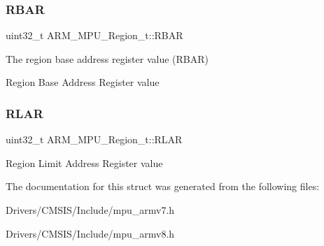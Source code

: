 \subsubsection{\texorpdfstring{RBAR}{RBAR}}
{\footnotesize\ttfamily uint32\+\_\+t A\+R\+M\+\_\+\+M\+P\+U\+\_\+\+Region\+\_\+t\+::\+R\+B\+AR}



The region base address register value (R\+B\+AR) 

Region Base Address Register value \mbox{\label{struct_a_r_m___m_p_u___region__t_ab5d3a650dbffd0b272bf7df5b140e8a8}} 
\subsubsection{\texorpdfstring{RLAR}{RLAR}}
{\footnotesize\ttfamily uint32\+\_\+t A\+R\+M\+\_\+\+M\+P\+U\+\_\+\+Region\+\_\+t\+::\+R\+L\+AR}

Region Limit Address Register value 

The documentation for this struct was generated from the following files\+:\begin{DoxyCompactItemize}
\item 
Drivers/\+C\+M\+S\+I\+S/\+Include/mpu\+\_\+armv7.\+h\item 
Drivers/\+C\+M\+S\+I\+S/\+Include/mpu\+\_\+armv8.\+h\end{DoxyCompactItemize}
